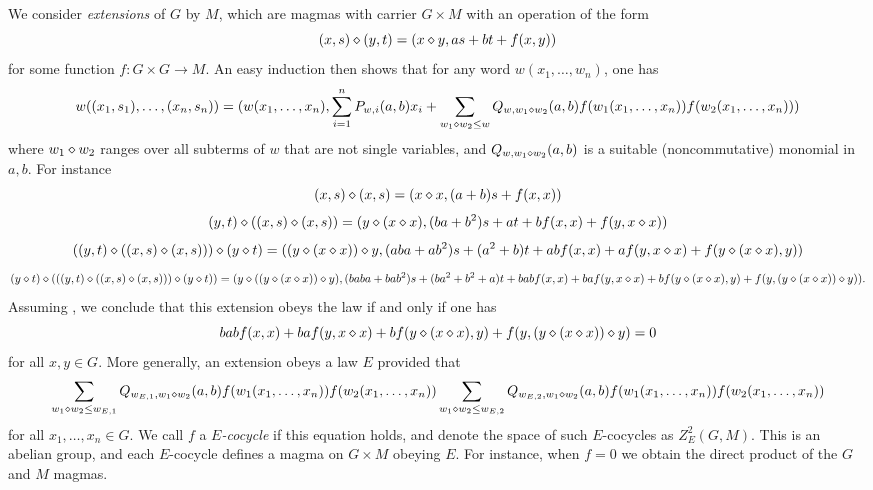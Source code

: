 We consider \emph{extensions} of $G$ by $M$, which are magmas with carrier $G \times M$ with an operation of the form
\begin{equation}\label{extension}
  (x,s) \diamond (y,t) = (x \diamond y, as + bt + f(x,y))
\end{equation}
for some function $f: G \times G \to M$.  An easy induction then shows that for any word $w(x_1,\dots,w_n)$, one has
$$ w((x_1,s_1),\dots,(x_n,s_n)) = (w(x_1,\dots,x_n), \sum_{i=1}^n P_{w,i}(a,b) x_i + \sum_{w_1 \diamond w_2 \leq w} Q_{w,w_1 \diamond w_2}(a,b) f(w_1(x_1,\dots,x_n)) f(w_2(x_1,\dots,x_n)))$$
where $w_1 \diamond w_2$ ranges over all subterms of $w$ that are not single variables, and $Q_{w,w_1 \diamond w_2}(a,b)$ is a suitable (noncommutative) monomial in $a,b$.  For instance
$$ (x,s) \diamond (x,s) = (x \diamond x, (a+b) s + f(x,x))$$
$$ (y,t) \diamond ((x,s) \diamond (x,s)) = (y \diamond (x \diamond x), (ba+b^2) s + at + b f(x,x) + f(y, x \diamond x))$$
$$ ((y,t) \diamond ((x,s) \diamond (x,s))) \diamond (y \diamond t) = ((y \diamond (x \diamond x)) \diamond y, (aba+ab^2) s + (a^2+b)t + ab f(x,x) + a f(y, x \diamond x) + f(y \diamond (x \diamond x), y))$$
$$ (y \diamond t) \diamond (((y,t) \diamond ((x,s) \diamond (x,s))) \diamond (y \diamond t)) = (y \diamond ((y \diamond (x \diamond x)) \diamond y), (baba+bab^2) s + (ba^2+b^2+a)t + bab f(x,x) + ba f(y, x \diamond x) + bf(y \diamond (x \diamond x), y) + f( y, (y \diamond (x \diamond x)) \diamond y)).$$
Assuming , we conclude that this extension obeys the law  if and only if one has
\begin{equation}\label{cocycle-1110}
  bab f(x,x) + ba f(y, x \diamond x) + bf(y \diamond (x \diamond x), y) + f( y, (y \diamond (x \diamond x)) \diamond y) = 0
\end{equation}
for all $x,y \in G$.  More generally, an extension obeys a law $E$ provided that
$$ \sum_{w_1 \diamond w_2 \leq w_{E,1}} Q_{w_{E,1},w_1 \diamond w_2}(a,b) f(w_1(x_1,\dots,x_n)) f(w_2(x_1,\dots,x_n))
\sum_{w_1 \diamond w_2 \leq w_{E,2}} Q_{w_{E,2},w_1 \diamond w_2}(a,b) f(w_1(x_1,\dots,x_n)) f(w_2(x_1,\dots,x_n))$$
for all $x_1,\dots,x_n \in G$.  We call $f$ a \emph{$E$-cocycle} if this equation holds, and denote the space of such $E$-cocycles as $Z^2_E(G,M)$.  This is an abelian group, and each $E$-cocycle defines a magma on $G \times M$ obeying $E$.  For instance, when $f=0$ we obtain the direct product of the $G$ and $M$ magmas.

